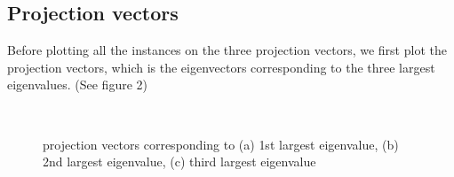 \documentclass{article}
\begin{document}
\subsection{Projection vectors}
Before plotting all the instances on the three projection vectors, we first plot the projection vectors, which is the eigenvectors corresponding to the three largest eigenvalues. (See figure 2)
   \begin{figure}[H]
   	\centering
   	
   	\\
   	\caption{projection vectors corresponding to (a) 1st largest eigenvalue, (b) 2nd largest eigenvalue, (c) third largest eigenvalue}
   	\label{fig:pattern1}
   \end{figure}
\end{document}
